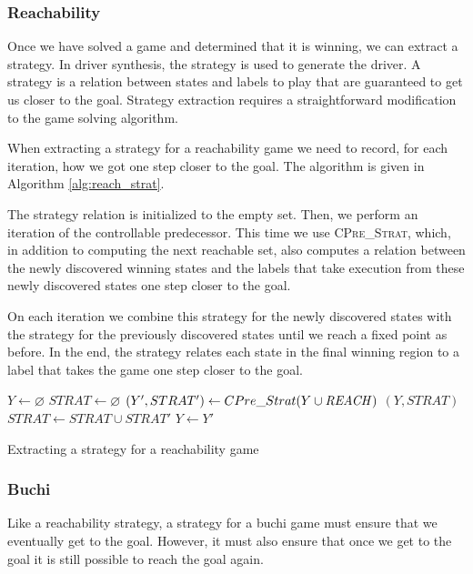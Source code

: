 \subsubsection{Reachability}

Once we have solved a game and determined that it is winning, we can extract a strategy. In driver synthesis, the strategy is used to generate the driver. A strategy is a relation between states and labels to play that are guaranteed to get us closer to the goal. Strategy extraction requires a straightforward modification to the game solving algorithm.

When extracting a strategy for a reachability game we need to record, for each iteration, how we got one step closer to the goal. The algorithm is given in Algorithm \ref{alg:reach_strat}. 

The strategy relation is initialized to the empty set. Then, we perform an iteration of the controllable predecessor. This time we use \textsc{CPre\_Strat}, which, in addition to computing the next reachable set, also computes a relation between the newly discovered winning states and the labels that take execution from these newly discovered states one step closer to the goal.

On each iteration we combine this strategy for the newly discovered states with the strategy for the previously discovered states until we reach a fixed point as before. In the end, the strategy relates each state in the final winning region to a label that takes the game one step closer to the goal.

\begin{algorithm}[t]
\begin{algorithmic}
\State $Y \gets \varnothing$
\State $STRAT \gets \varnothing$
\Loop
\State $(Y', STRAT') \gets CPre\_Strat(Y \cup \mathit{REACH})$
\State\Return $(Y, STRAT)$\EndIf
\State $STRAT \gets STRAT \cup STRAT'$
\State $Y \gets Y'$
\EndLoop
\EndFunction
\end{algorithmic}
\caption{Extracting a strategy for a reachability game}
\label{alg:reach_strat}
\end{algorithm}

\subsubsection{Buchi}

Like a reachability strategy, a strategy for a buchi game must ensure that we eventually get to the goal. However, it must also ensure that once we get to the goal it is still possible to reach the goal again. 

